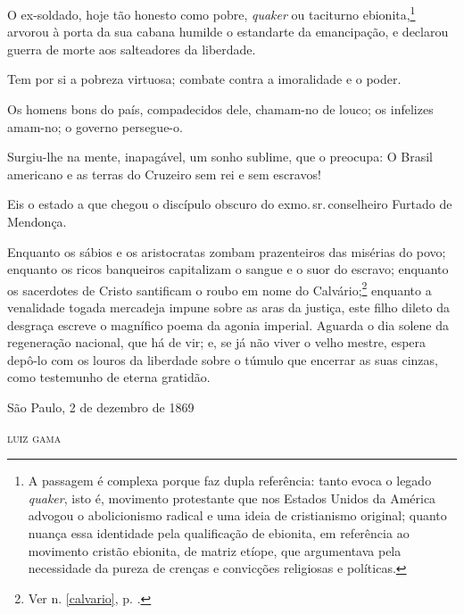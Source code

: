 O ex-soldado, hoje tão honesto como pobre, \emph{quaker} ou taciturno
ebionita,\footnote{A passagem é complexa porque faz dupla referência:
  tanto evoca o legado \emph{quaker}, isto é, movimento protestante que nos
  Estados Unidos da América advogou o abolicionismo radical e uma ideia
  de cristianismo original; quanto nuança essa identidade pela
  qualificação de ebionita, em referência ao movimento cristão ebionita,
  de matriz etíope, que argumentava pela necessidade da pureza de
  crenças e convicções religiosas e políticas.} arvorou à porta da sua
cabana humilde o estandarte da emancipação, e declarou guerra de morte
aos salteadores da liberdade.

Tem por si a pobreza virtuosa; combate contra a imoralidade e o poder.

Os homens bons do país, compadecidos dele, chamam-no de louco; os
infelizes amam-no; o governo persegue-o.

Surgiu-lhe na mente, inapagável, um sonho sublime, que o preocupa: O
Brasil americano e as terras do Cruzeiro sem rei e sem escravos!

Eis o estado a que chegou o discípulo obscuro do exmo.\,sr.\,conselheiro
Furtado de Mendonça.

Enquanto os sábios e os aristocratas zombam prazenteiros das misérias do
povo; enquanto os ricos banqueiros capitalizam o sangue e o suor do
escravo; enquanto os sacerdotes de Cristo santificam o roubo em nome do
Calvário;\footnote{Ver n. \ref{calvario}, p. \pageref{calvario}.} enquanto 
a venalidade togada mercadeja impune sobre as aras da justiça, este filho 
dileto da desgraça escreve o magnífico poema da agonia imperial. Aguarda 
o dia solene da regeneração nacional, que há de vir; e, se já não viver o 
velho mestre, espera depô-lo com os louros da liberdade sobre o túmulo que 
encerrar as suas cinzas, como testemunho de eterna gratidão.

\begin{flushright}
São Paulo, 2 de dezembro de 1869

\textsc{luiz gama}
\end{flushright}

